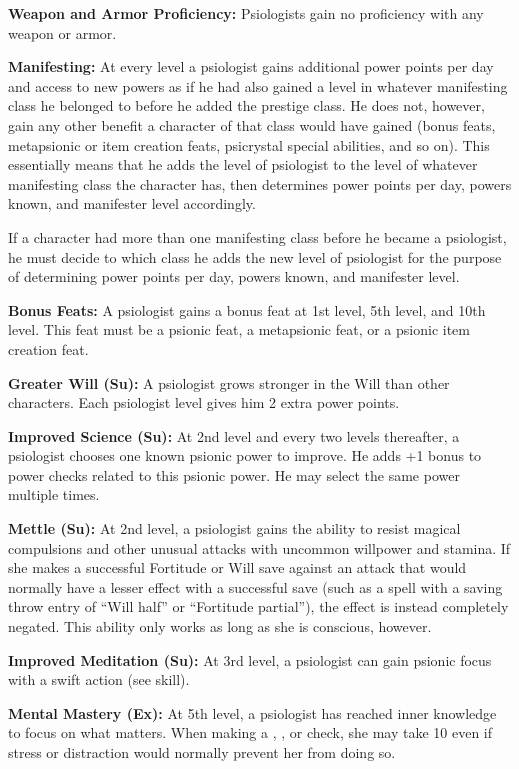 {
\textbf{Weapon and Armor Proficiency:} Psiologists gain no proficiency with any weapon or armor.

\textbf{Manifesting:} At every level a psiologist gains additional power points per day and access to new powers as if he had also gained a level in whatever manifesting class he belonged to before he added the prestige class. He does not, however, gain any other benefit a character of that class would have gained (bonus feats, metapsionic or item creation feats, psicrystal special abilities, and so on). This essentially means that he adds the level of psiologist to the level of whatever manifesting class the character has, then determines power points per day, powers known, and manifester level accordingly.

If a character had more than one manifesting class before he became a psiologist, he must decide to which class he adds the new level of psiologist for the purpose of determining power points per day, powers known, and manifester level.


\textbf{Bonus Feats:} A psiologist gains a bonus feat at 1st level, 5th level, and 10th level. This feat must be a psionic feat, a metapsionic feat, or a psionic item creation feat.

\textbf{Greater Will (Su):} A psiologist grows stronger in the Will than other characters. Each psiologist level gives him 2 extra power points.

\textbf{Improved Science (Su):} At 2nd level and every two levels thereafter, a psiologist chooses one known psionic power to improve. He adds +1 bonus to power checks related to this psionic power. He may select the same power multiple times.

\textbf{Mettle (Su):} At 2nd level, a psiologist gains the ability to resist magical compulsions and other unusual attacks with uncommon willpower and stamina. If she makes a successful Fortitude or Will save against an attack that would normally have a lesser effect with a successful save (such as a spell with a saving throw entry of ``Will half'' or ``Fortitude partial''), the effect is instead completely negated. This ability only works as long as she is conscious, however.

\textbf{Improved Meditation (Su):} At 3rd level, a psiologist can gain psionic focus with a swift action (see  skill).

\textbf{Mental Mastery (Ex):} At 5th level, a psiologist has reached inner knowledge to focus on what matters. When making a , , or  check, she may take 10 even if stress or distraction would normally prevent her from doing so.

}
